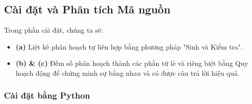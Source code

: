 \documentclass[a4paper,12pt]{article}
\begin{document}
\subsection{Cài đặt và Phân tích Mã nguồn}
Trong phần cài đặt, chúng ta sẽ:
\begin{itemize}
    \item \textbf{(a)} Liệt kê phân hoạch tự liên hợp bằng phương pháp "Sinh và Kiểm tra".
    \item \textbf{(b) \& (c)} Đếm số phân hoạch thành các phần tử lẻ và riêng biệt bằng Quy hoạch động để chứng minh sự bằng nhau và có được câu trả lời hiệu quả.
\end{itemize}
\subsubsection{Cài đặt bằng Python}
\end{document}
